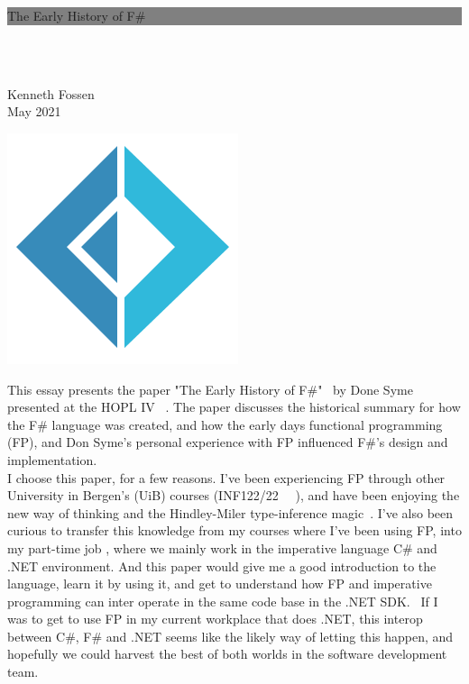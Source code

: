 \documentclass[12pt]{article}
\begin{document}
	\colorbox{grey}{
		\parbox[t]{0.93\textwidth}{ %
			\parbox[t]{0.91\textwidth}{ %
				\raggedleft %
				\fontsize{50pt}{80pt}\selectfont %
				\vspace{0.7cm} %
				
			    The Early History of F\#\\
			   
				\vspace{0.7cm} %
			}
		}
	}
\\\\
\parbox[t]{0.93\textwidth}{
    \raggedleft
    Kenneth Fossen\\
    May 2021
}


\includegraphics[scale=0.75]{img/fsharp256.png}

\vfil


This essay presents the paper "The Early History of F\#"~\cite{syme_early_2020} by Done Syme~\cite{noauthor_don_2021} presented at the HOPL IV ~\cite{noauthor_hopl_nodate}.
The paper discusses the historical summary for how the F\# language was created, and how the early days functional programming (FP), and Don Syme's personal experience with FP influenced F\#'s design and implementation.
\\

I choose this paper, for a few reasons. I've been experiencing FP through other University in Bergen's (UiB) courses (INF122/22 ~\cite{noauthor_funksjonell_nodate}~\cite{noauthor_programmeringssprak_nodate}), and have been enjoying the new way of thinking and the Hindley-Miler type-inference magic~\cite{noauthor_hindleymilner_2021}.
I've also been curious to transfer this knowledge from my courses where I've been using FP, into my part-time job , where we mainly work in the imperative language C\# and .NET environment. And this paper would give me a good introduction to the language, learn it by using it, and get to understand how FP and imperative programming can inter operate in the same code base in the .NET SDK.~\cite{dykstra_net_nodate}
If I was to get to use FP in my current workplace that does .NET, this interop between C\#, F\# and .NET seems like the likely way of letting this happen, and hopefully we could harvest the best of both worlds in the software development team.
 
\end{document}
